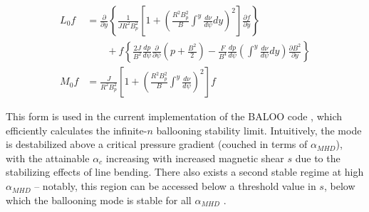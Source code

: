\begin{equation}\label{eq:baloo2}
 \begin{aligned}
  L_0 f &= \frac{\partial}{\partial y} \left\{ \frac{1}{JR^2 B_p^2} \left[ 1 + \left( \frac{R^2 B_p^2}{B} \int^y \frac{d\nu}{d\psi} dy \right)^2 \right] \frac{\partial f}{\partial y} \right\}\\
  &\qquad + f \left\{ \frac{2J}{B^2} \frac{dp}{d\psi} \frac{\partial}{\partial \psi} \left( p + \frac{B^2}{2} \right) - \frac{F}{B^4} \frac{dp}{d\psi} \left( \int^y \frac{d\nu}{d\psi} dy \right) \frac{\partial B^2}{\partial y} \right\}\\
  M_0 f &= \frac{J}{R^2 B_p^2} \left[ 1 + \left( \frac{R^2 B_p^2}{B} \int^y \frac{d\nu}{d\psi} \right)^2 \right] f
 \end{aligned}
\end{equation}

\noindent This form is used in the current implementation of the BALOO code \cite{Connor1979,Miller1987,Miller1997}, which efficiently calculates the infinite-$n$ ballooning stability limit.  Intuitively, the mode is destabilized above a critical pressure gradient (couched in terms of $\alpha_{MHD}$), with the attainable $\alpha_c$ increasing with increased magnetic shear $s$ due to the stabilizing effects of line bending.  There also exists a second stable regime at high $\alpha_{MHD}$ -- notably, this region can be accessed below a threshold value in $s$, below which the ballooning mode is stable for all $\alpha_{MHD}$ \cite{Miller1998,Connor1998,Wilson1999}.


